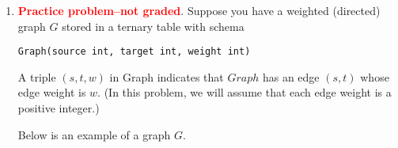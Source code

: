 \documentclass{article}
\begin{document}
\begin{enumerate}[resume]
\begin{enumerate}
In this problem, you are {\bf not} allowed to use arrays to implement this data structure!
Rather you must you relations.

\item Then, using the heap data structure developed in question~\ref{heap}, write a PostgreSQL program {\tt heapSort()} that implement the {\tt Heapsort} algorithm.   For a description of this algorithm, see

\begin{center}
https://en.wikipedia.org/wiki/Heapsort
\end{center}

You are {\bf not} allowed to use arrays to implement this the {\tt Heapsort} algorithm!
\end{enumerate}

The input format is a list of integers stored in a binary relation {\tt Data(index,value)}.
For example, {\tt Data} could contain the following data.

\begin{center}
\begin{tabular}{c}
Data\\
\begin{tabular}{cc}
index & value \\ \hline
1        &  3 \\
2        &  1 \\
3       &   2 \\
4       &   0 \\
5      &    7 \\
\end{tabular}
\end{tabular}
\end{center}

The output of {\tt heapSort()} should be stored in a relation {\tt sortedData(index,value)}.
On the {\tt Data} relation above, this should be the following relation:

\newpage
\item \textcolor{red}{\bf Practice problem--not graded}. 
Suppose you have a weighted (directed) graph $G$ stored
  in a ternary table with schema
  \begin{center}
  {\tt Graph(source int, target int, weight int)}
  \end{center}
    A triple
  $(s,t,w)$ in Graph indicates that $Graph$ has an edge $(s,t)$ whose
  edge weight is $w$.
  (In this problem, we will assume that each edge weight is a positive
  integer.)

  Below  is an example of a graph $G$.



\end{enumerate}
\end{document}
